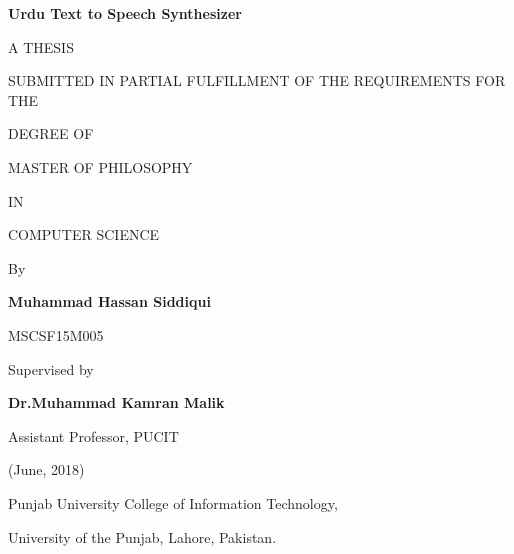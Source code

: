 \newpage
\begin{center}
\Large{\textbf{Urdu Text to Speech Synthesizer}}



A THESIS

SUBMITTED IN PARTIAL FULFILLMENT OF THE REQUIREMENTS FOR THE 

DEGREE OF

MASTER OF PHILOSOPHY

IN

COMPUTER SCIENCE

\bigskip

    By
    
\large{\textbf{Muhammad Hassan Siddiqui}}

\large{MSCSF15M005}

\bigskip
Supervised by

\large{\textbf{Dr.Muhammad Kamran Malik}}

Assistant Professor, PUCIT




\bigskip
(June, 2018)

\bigskip
Punjab University College of Information Technology,

\bigskip
University of the Punjab, Lahore, Pakistan. 

\end{center}
\bigskip




 








%





